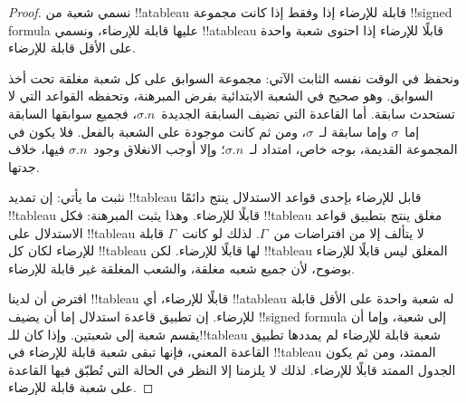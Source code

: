 \documentclass[../../../include/open-logic-section]{subfiles}
\begin{document}
\begin{proof}
نسمي شعبة من !!a{tableau} قابلة للإرضاء إذا وفقط إذا كانت مجموعة
!!{signed formula} عليها قابلة للإرضاء، ونسمي !!a{tableau} قابلًا
للإرضاء إذا احتوى شعبة واحدة على الأقل قابلة للإرضاء.

ونحفظ في الوقت نفسه الثابت الآتي: مجموعة السوابق على كل شعبة مغلقة تحت
أخذ السوابق. وهو صحيح في الشعبة الابتدائية بفرض المبرهنة، وتحفظه القواعد
التي لا تستحدث سابقة. أما القاعدة التي تضيف السابقة الجديدة~$\sigma.n$،
فجميع سوابقها السابقة إما~$\sigma$ وإما سابقة لـ~$\sigma$، ومن ثم كانت
موجودة على الشعبة بالفعل. فلا يكون في المجموعة القديمة، بوجه خاص، امتداد
لـ~$\sigma.n$؛ وإلا أوجب الانغلاق وجود~$\sigma.n$ فيها، خلاف جدتها.

نثبت ما يأتي: إن تمديد !!{tableau} قابل للإرضاء بإحدى قواعد الاستدلال
ينتج دائمًا !!{tableau} قابلًا للإرضاء. وهذا يثبت المبرهنة: فكل
!!{tableau} مغلق ينتج بتطبيق قواعد الاستدلال على !!{tableau} لا يتألف
إلا من افتراضات من~$\Gamma$. لذلك لو كانت~$\Gamma$ قابلة للإرضاء لكان
كل !!{tableau} لها قابلًا للإرضاء. لكن !!{tableau} المغلق ليس قابلًا
للإرضاء بوضوح، لأن جميع شعبه مغلقة، والشعب المغلقة غير قابلة للإرضاء.

افترض أن لدينا !!{tableau} قابلًا للإرضاء، أي !!a{tableau} له شعبة
واحدة على الأقل قابلة للإرضاء. إن تطبيق قاعدة استدلال إما أن يضيف
!!{signed formula} إلى شعبة، وإما أن يقسم شعبة إلى شعبتين. وإذا كان
للـ!!{tableau} شعبة قابلة للإرضاء لم يمددها تطبيق القاعدة المعني، فإنها
تبقى شعبة قابلة للإرضاء في !!{tableau} الممتد، ومن ثم يكون الجدول الممتد
قابلًا للإرضاء. لذلك لا يلزمنا إلا النظر في الحالة التي تُطبّق فيها
القاعدة على شعبة قابلة للإرضاء.


\end{proof}
\end{document}
